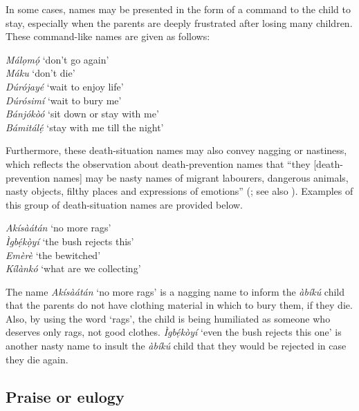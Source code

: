 \documentclass[output=paper,colorlinks,citecolor=brown]{langscibook}
\begin{document}
In some cases, names may be presented in the form of a command to the child to stay, especially when the parents are deeply frustrated after losing many children. These command-like names are given as follows:

\ea \label{DeathNames2}
\begin{xlist}
\ex	\textit{Málọmọ́}		‘don’t go again’\\
\ex	\textit{Máku}			‘don’t die’\\
\ex	\textit{Dúrójayé}		‘wait to enjoy life’\\
\ex	\textit{Dúrósimí}		‘wait to bury me’\\
\ex	\textit{Bánjókòó}		‘sit down or stay with me’\\
\ex	\textit{Bámitálẹ́}		‘stay with me till the night’\\
\end{xlist}
\z

Furthermore, these death-situation names may also convey nagging or nastiness, which reflects the observation about death-prevention names that ``they [death-prevention names] may be nasty names of migrant labourers, dangerous animals, nasty objects, filthy places and expressions of emotions'' (\cite[221]{Agyekum2006Sociolinguistics}; see also \cite{Obeng2001, Obeng1998}). Examples of this group of death-situation names are provided below.

\ea \label{DeathNames3}
\begin{xlist}
\ex	\textit{Akísàátán}		‘no more rags’\\
\ex	\textit{Ìgbẹ́kọ̀yí}		‘the bush rejects this’\\
\ex	\textit{Emèrè}			‘the bewitched’\\
\ex	\textit{Kílànkó}			‘what are we collecting'\\
\end{xlist}
\z

 The name \textit{Akísàátán} ‘no more rags’ is a nagging name to inform the \textit{àbíkú} child that the parents do not have clothing material in which to bury them, if they die. Also, by using the word ‘rags’, the child is being humiliated as someone who deserves only rags, not good clothes. \textit{Ìgbẹ́kòyí} ‘even the bush rejects this one’ is another nasty name to insult the \textit{àbíkú} child that they would be rejected in case they die again. 

\subsection{Praise or eulogy}
\end{document}
